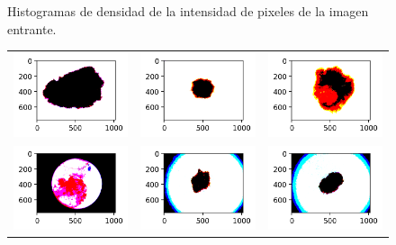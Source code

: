 \begin{figure}[ht]
\begin{tabular}{ccc}
    \end{tabular}        
    \caption{Histogramas de densidad de la intensidad de pixeles de la imagen entrante.}
    \label{fig:thresh_input_2}
\end{figure}

\begin{figure}[!b]
    \centering
    \begin{tabular}{ccc}
        \includegraphics[width=4cm]{../Plots/THR/filtered_0.png} &
        \includegraphics[width=4cm]{../Plots/THR/filtered_1.png} &
        \includegraphics[width=4cm]{../Plots/THR/filtered_2.png} \\

        \includegraphics[width=4cm]{../Plots/THR/filtered_3.png} &
        \includegraphics[width=4cm]{../Plots/THR/filtered_4.png} &
        \includegraphics[width=4cm]{../Plots/THR/filtered_5.png} \\
        

\end{tabular}
\end{figure}
